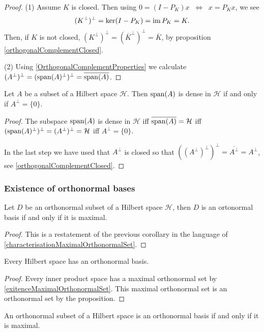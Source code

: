\begin{proof}
(1) Assume $K$ is closed. Then using $0=(I-P_K)x\;\; \Leftrightarrow \;\; x=P_Kx$, we see
\[ (K^\perp)^\perp = \ker(I-P_K) = \operatorname{im} P_K = K. \]
Then, if $K$ is not closed, $(K^\perp)^\perp = (\overline{K}^\perp)^\perp = \overline{K}$, by proposition \ref{orthogonalComplementClosed}.

(2) Using \ref{OrthogonalComplementProperties} we calculate $(A^\perp)^\perp = (\operatorname{span}(A)^\perp)^\perp = \overline{\operatorname{span}(A)}$.
\end{proof}
\begin{corollary} \label{denseZeroComplement}
Let $A$ be a subset of a Hilbert space $\mathcal{H}$. Then $\operatorname{span}(A)$ is dense in $\mathcal{H}$ \textup{if and only if} $A^\perp = \{0\}$.
\end{corollary}
\begin{proof}
The subspace $\operatorname{span}(A)$ is dense in $\mathcal{H}$ iff $\overline{\operatorname{span}(A)} = \mathcal{H}$ iff $(\operatorname{span}(A)^\perp)^\perp = (A^\perp)^\perp = \mathcal{H}$ iff $A^\perp = \{0\}$.

In the last step we have used that $A^\perp$ is closed so that $((A^\perp)^\perp)^\perp = \overline{A^\perp} = A^\perp$, see \ref{orthogonalComplementClosed}.
\end{proof}

\subsubsection{Existence of orthonormal bases}
\begin{corollary}
Let $D$ be an orthonormal subset of a Hilbert space $\mathcal{H}$, then $D$ is an ortonormal basis \textup{if and only if} it is maximal.
\end{corollary}
\begin{proof}
This is a restatement of the previous corollary in the language of \ref{characterisationMaximalOrthonormalSet}.
\end{proof}
\begin{corollary}
Every Hilbert space has an orthonormal basis.
\end{corollary}
\begin{proof}
Every inner product space has a maximal orthonormal set by \ref{exitenceMaximalOrthonormalSet}. This maximal orthonormal set is an orthonormal set by the proposition.
\end{proof}
\begin{corollary} \label{HilbertOnBasisMaximal}
An orthonormal subset of a Hilbert space is an orthonormal basis \textup{if and only if} it is maximal.
\end{corollary}

